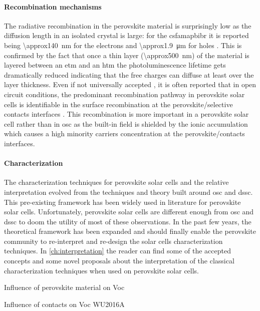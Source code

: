 	\paragraph{Recombination mechanisms} The radiative recombination in the perovskite material is surprisingly low as the diffusion length in an isolated crystal is large: for the \gls{csfamapbibr} it is reported being \SI{\approx140}{\nm} for the electrons and \SI{\approx1.9}{\um} for holes \cite{Liu2017}. This is confirmed by the fact that once a thin layer (\SI{\approx500}{\nm}) of the material is layered between an \gls{etm} and an \gls{htm} the photoluminescence lifetime gets dramatically reduced \cite{Jimenez-Lopez2017} indicating that the free charges can diffuse  at least over the layer thickness. Even if not universally accepted \cite{Valadez-Villalobos2019}, it is often reported that in open circuit conditions, the predominant recombination pathway in perovskite solar cells is identifiable in the surface recombination at the perovskite/selective contacts interfaces \cite{Calado2018b,Stolterfoht2018a,Stolterfoht2018}. This recombination is more important in a perovskite solar cell rather than in \gls{osc} as the built-in field is shielded by the ionic accumulation which causes a high minority carriers concentration at the perovskite/contacts interfaces.

	\paragraph{Characterization}
	The characterization techniques for perovskite solar cells and the relative interpretation evolved from the techniques and theory built around \gls{osc} and \gls{dssc}. This pre-existing framework has been widely used in literature for perovskite solar cells. Unfortunately, perovskite solar cells are different enough from \gls{osc} and \gls{dssc} to doom the utility of most of these observations. In the past few years, the theoretical framework has been expanded and should finally enable the perovskite community to re-interpret and re-design the solar cells characterization techniques. In \cref{ch:interpretation} the reader can find some of the accepted concepts and some novel proposals about the interpretation of the classical characterization techniques when used on perovskite solar cells.

Influence of perovskite material on Voc \cite{Wheeler2017,Eperon2014,Noh2013a}

Influence of contacts on Voc \cite{CorreaBaena2015} WU2016A

